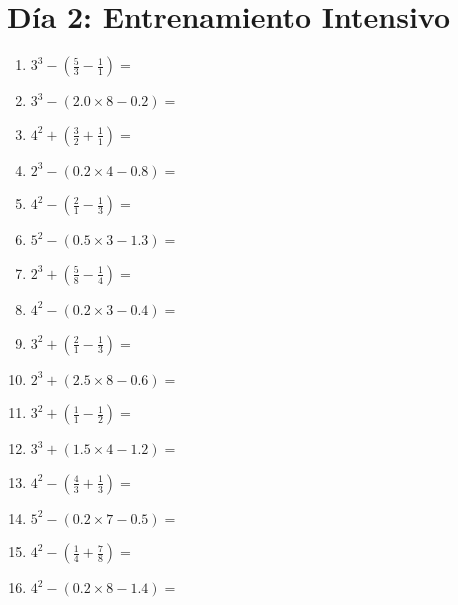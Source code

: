 \documentclass[12pt]{article}
\begin{document}
\section*{Día 2: Entrenamiento Intensivo}
\begin{enumerate}
\item \large $ 3^{3} - (\frac{5}{3} - \frac{1}{1}) = $ \vspace{1.6cm}
\item \large $ 3^{3} - (2.0 \times 8 - 0.2) = $ \vspace{1.6cm}
\item \large $ 4^{2} + (\frac{3}{2} + \frac{1}{1}) = $ \vspace{1.6cm}
\item \large $ 2^{3} - (0.2 \times 4 - 0.8) = $ \vspace{1.6cm}
\item \large $ 4^{2} - (\frac{2}{1} - \frac{1}{3}) = $ \vspace{1.6cm}
\item \large $ 5^{2} - (0.5 \times 3 - 1.3) = $ \vspace{1.6cm}
\item \large $ 2^{3} + (\frac{5}{8} - \frac{1}{4}) = $ \vspace{1.6cm}
\item \large $ 4^{2} - (0.2 \times 3 - 0.4) = $ \vspace{1.6cm}
\item \large $ 3^{2} + (\frac{2}{1} - \frac{1}{3}) = $ \vspace{1.6cm}
\item \large $ 2^{3} + (2.5 \times 8 - 0.6) = $ \vspace{1.6cm}
\newpage
\item \large $ 3^{2} + (\frac{1}{1} - \frac{1}{2}) = $ \vspace{1.6cm}
\item \large $ 3^{3} + (1.5 \times 4 - 1.2) = $ \vspace{1.6cm}
\item \large $ 4^{2} - (\frac{4}{3} + \frac{1}{3}) = $ \vspace{1.6cm}
\item \large $ 5^{2} - (0.2 \times 7 - 0.5) = $ \vspace{1.6cm}
\item \large $ 4^{2} - (\frac{1}{4} + \frac{7}{8}) = $ \vspace{1.6cm}
\item \large $ 4^{2} - (0.2 \times 8 - 1.4) = $ \vspace{1.6cm}

\end{enumerate}
\end{document}
